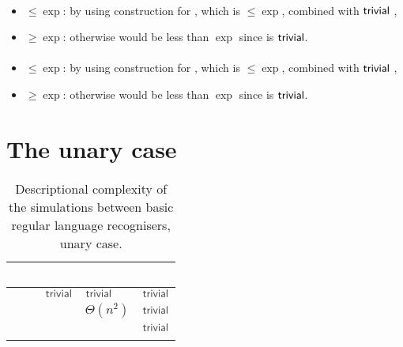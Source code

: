 \paragraph{\ODLA{}\tto\ONFA}
\begin{itemize}
	\item $\le\exp$: by using construction for \hyperref[cost:1DLAto1DFA]{\ODLA{}\tto\ODFA}, which is $\le\exp$, combined with $\mathsf{trivial}$ \ODFA{}\tto\ONFA,
	\item $\ge\exp$: otherwise \hyperref[cost:1DLAto2NFA]{\ODLA{}\tto\TNFA} would be less than $\exp$ since \ONFA{}\tto\TNFA is $\mathsf{trivial}$.
\end{itemize}
\paragraph{\ODLA{}\tto\TDFA}
\begin{itemize}
	\item $\le\exp$: by using construction for \hyperref[cost:1DLAto1DFA]{\ODLA{}\tto\ODFA}, which is $\le\exp$, combined with $\mathsf{trivial}$ \ODFA{}\tto\TDFA,
	\item $\ge\exp$: otherwise \hyperref[cost:1DLAto2NFA]{\ODLA{}\tto\TNFA} would be less than $\exp$ since \TDFA{}\tto\TNFA is $\mathsf{trivial}$.
\end{itemize}



\section{The unary case}\label{sec:prevsims-unary}

\begin{table}
	\centering
	\renewcommand{\arraystretch}{1.2}
	\begin{tabular}{|l|l|l|p{4.3em}|l|}
		\hline
		~     & \ODFA           & \ONFA           & \TDFA                                            & \TNFA     \\ \hline
		\ODFA & \cY             & $\Cctriv$       & $\Cctriv$                                        & $\Cctriv$ \\ \hline
		\ONFA & \rbt{$\CsubEq$} & \cY             & \cR $\Theta(n^2)$                                & $\Cctriv$ \\ \hline
		\TDFA & \rbt{$\CsubEq$} & \rbt{$\CsubEq$} & \cY                                              & $\Cctriv$ \\ \hline
		\TNFA & \rbt{$\CsubEq$} & \rbt{$\CsubEq$} & \cR \rbt[.4]{$\le\Csubln$} \rbt[.3]{$\ge\Cpoly$} & \cY       \\ \hline
	\end{tabular}
	\caption{Descriptional complexity of the simulations between basic regular language recognisers, unary case.}
	\label{tab:sims-core-unary}
\end{table}

